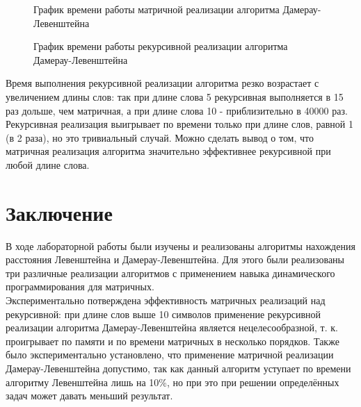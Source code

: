 \documentclass[12pt, a4paper]{report}
\begin{document}
	\begin{figure}[ht!]
		\caption{График времени работы матричной реализации алгоритма Дамерау-Левенштейна}
	\end{figure}
	
	\begin{figure}[ht!]
		\caption{График времени работы рекурсивной реализации алгоритма Дамерау-Левенштейна}
	\end{figure}
	
 	Время выполнения рекурсивной реализации алгоритма резко возрастает с увеличением длины слов: так при длине слова 5 рекурсивная выполняется в 15 раз дольше, чем матричная, а при длине слова 10 - приблизительно в 40000 раз. Рекурсивная реализация выигрывает по времени только при длине слов, равной 1 (в 2 раза), но это тривиальный случай. Можно сделать вывод о том, что матричная реализация алгоритма значительно эффективнее рекурсивной при любой длине слова.

	\chapter*{Заключение}
	В ходе лабораторной работы были изучены и реализованы алгоритмы нахождения расстояния Левенштейна и Дамерау-Левенштейна. Для этого были реализованы три различные реализации алгоритмов с применением навыка динамического программирования для матричных.\\
	Экспериментально потверждена эффективность матричных реализаций над рекурсивной: при длине слов выше 10 символов применение рекурсивной реализации алгоритма Дамерау-Левенштейна является нецелесообразной, т. к. проигрывает по памяти и по времени матричных в несколько порядков. Также было экспериментально установлено, что применение матричной реализации Дамерау-Левенштейна допустимо, так как данный алгоритм уступает по времени алгоритму Левенштейна лишь на 10\%, но при это при решении определённых задач может давать меньший результат.
	\newpage
	
\end{document}
